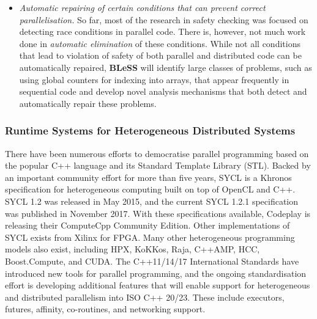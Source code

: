 \documentclass[a4paper,11pt]{article}
\newcommand{\project}[1]{\textbf{#1}\xspace}
\newcommand{\BLESS}{\project{BLeSS}}
\newcommand{\TheProject}{\BLESS}
\begin{document}
\begin{itemize}
\item \emph{Automatic repairing of certain conditions that can prevent 
correct parallelisation.} So far, most of the research in safety checking 
was focused on detecting race conditions in parallel code. There is, however, 
not much work done in \emph{automatic elimination} of these conditions. 
While not all conditions that lead to violation of safety of both parallel and distributed  code 
can be automatically repaired, \TheProject will identify large classes of problems, 
such as using global counters for indexing into arrays, that appear frequently
in sequential code and develop novel analysis mechanisms that both detect and
automatically repair these problems.
\end{itemize}


\subsubsection{Runtime Systems for Heterogeneous Distributed Systems}
\label{sect:compilers}


There have been numerous efforts to democratise parallel programming 
based on the popular C++ language and its Standard Template Library (STL). 
Backed by an important community effort for more than five years, SYCL is a Khronos specification for heterogeneous computing built on top of OpenCL and C++. SYCL 1.2 was released in May 2015, and the current SYCL 1.2.1 specification was published in November 2017. With these specifications available, Codeplay is releasing their ComputeCpp Community Edition. Other implementations of SYCL exists from Xilinx for FPGA.
Many other heterogeneous programming models also exist, including HPX, KoKKos, Raja, C++AMP, HCC, Boost.Compute, and CUDA. The C++11/14/17 International Standards have introduced new tools for parallel programming, and the ongoing standardisation effort is developing additional features that will enable support for heterogeneous and distributed parallelism into ISO C++ 20/23. These include executors, futures, affinity, co-routines, and networking support. 
\end{document}
